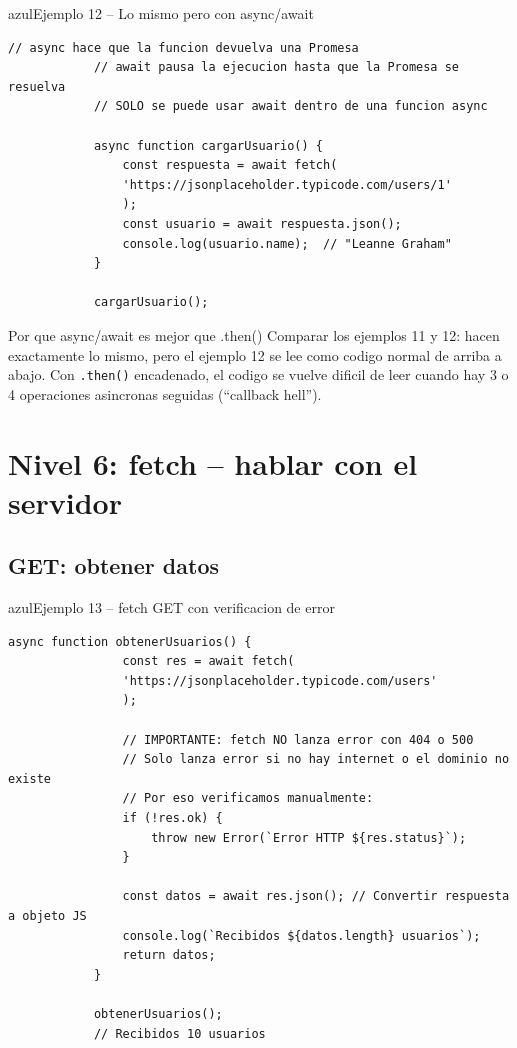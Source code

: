 \documentclass[11pt,a4paper]{article}
\begin{document}
	\begin{cajacodigo}{azul}{Ejemplo 12 -- Lo mismo pero con async/await}
		\begin{lstlisting}[style=codejs]
			// async hace que la funcion devuelva una Promesa
			// await pausa la ejecucion hasta que la Promesa se resuelva
			// SOLO se puede usar await dentro de una funcion async
			
			async function cargarUsuario() {
				const respuesta = await fetch(
				'https://jsonplaceholder.typicode.com/users/1'
				);
				const usuario = await respuesta.json();
				console.log(usuario.name);  // "Leanne Graham"
			}
			
			cargarUsuario();
		\end{lstlisting}
	\end{cajacodigo}
	
	\begin{cajaconcepto}{Por que async/await es mejor que .then()}
		Comparar los ejemplos 11 y 12: hacen exactamente lo mismo, pero el ejemplo 12 se lee como codigo normal de arriba a abajo. Con \texttt{.then()} encadenado, el codigo se vuelve dificil de leer cuando hay 3 o 4 operaciones asincronas seguidas (``callback hell'').
	\end{cajaconcepto}
	
	\section{Nivel 6: fetch -- hablar con el servidor}
	
	\subsection{GET: obtener datos}
	
	\begin{cajacodigo}{azul}{Ejemplo 13 -- fetch GET con verificacion de error}
		\begin{lstlisting}[style=codejs]
			async function obtenerUsuarios() {
				const res = await fetch(
				'https://jsonplaceholder.typicode.com/users'
				);
				
				// IMPORTANTE: fetch NO lanza error con 404 o 500
				// Solo lanza error si no hay internet o el dominio no existe
				// Por eso verificamos manualmente:
				if (!res.ok) {
					throw new Error(`Error HTTP ${res.status}`);
				}
				
				const datos = await res.json(); // Convertir respuesta a objeto JS
				console.log(`Recibidos ${datos.length} usuarios`);
				return datos;
			}
			
			obtenerUsuarios();
			// Recibidos 10 usuarios
		\end{lstlisting}
	\end{cajacodigo}
	
\end{document}

